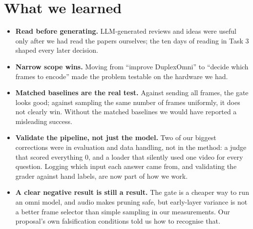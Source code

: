 \documentclass[11pt]{article}
\begin{document}
\section*{What we learned}
\begin{itemize}
\item \textbf{Read before generating.} LLM-generated reviews and ideas were useful only after we had read the papers ourselves; the ten days of reading in Task 3 shaped every later decision.
\item \textbf{Narrow scope wins.} Moving from ``improve DuplexOmni'' to ``decide which frames to encode'' made the problem testable on the hardware we had.
\item \textbf{Matched baselines are the real test.} Against sending all frames, the gate looks good; against sampling the same number of frames uniformly, it does not clearly win. Without the matched baselines we would have reported a misleading success.
\item \textbf{Validate the pipeline, not just the model.} Two of our biggest corrections were in evaluation and data handling, not in the method: a judge that scored everything 0, and a loader that silently used one video for every question. Logging which input each answer came from, and validating the grader against hand labels, are now part of how we work.
\item \textbf{A clear negative result is still a result.} The gate is a cheaper way to run an omni model, and audio makes pruning safe, but early-layer variance is not a better frame selector than simple sampling in our measurements. Our proposal's own falsification conditions told us how to recognise that.
\end{itemize}
\end{document}
